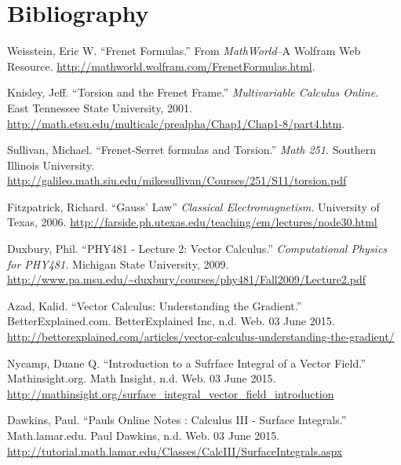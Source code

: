\documentclass[12pt,letterpaper,english]{article}
\begin{document}










\section{Bibliography}

\begin{thebibliography}{56}

  Weisstein, Eric W. ``Frenet Formulas.'' From \emph{MathWorld}--A Wolfram Web Resource. \url{http://mathworld.wolfram.com/FrenetFormulas.html}.

  Knisley, Jeff. ``Torsion and the Frenet Frame.'' \emph{Multivariable Calculus Online.} East Tennessee State University, 2001. \url{http://math.etsu.edu/multicalc/prealpha/Chap1/Chap1-8/part4.htm}.

  Sullivan, Michael. ``Frenet-Serret formulas and Torsion.'' \emph{Math 251.} Southern Illinois University. \url{http://galileo.math.siu.edu/mikesullivan/Courses/251/S11/torsion.pdf}

  Fitzpatrick, Richard. ``Gauss' Law'' \emph{Classical Electromagnetism.} University of Texas, 2006. \url{http://farside.ph.utexas.edu/teaching/em/lectures/node30.html}

  Duxbury, Phil. ``PHY481 - Lecture 2: Vector Calculus.'' \emph{Computational Physics for PHY481.} Michigan State University, 2009. \url{http://www.pa.msu.edu/~duxbury/courses/phy481/Fall2009/Lecture2.pdf}

  Azad, Kalid. ``Vector Calculus: Understanding the Gradient.'' BetterExplained.com. BetterExplained Inc, n.d. Web. 03 June 2015. \url{http://betterexplained.com/articles/vector-calculus-understanding-the-gradient/}

  Nycamp, Duane Q. ``Introduction to a Sufrface Integral of a Vector Field.'' Mathinsight.org. Math Insight, n.d. Web. 03 June 2015. \url{http://mathinsight.org/surface_integral_vector_field_introduction}

  Dawkins, Paul. ``Pauls Online Notes : Calculus III - Surface Integrals.'' Math.lamar.edu. Paul Dawkins, n.d. Web. 03 June 2015. \url{http://tutorial.math.lamar.edu/Classes/CalcIII/SurfaceIntegrals.aspx}

\end{thebibliography}
\end{document}
